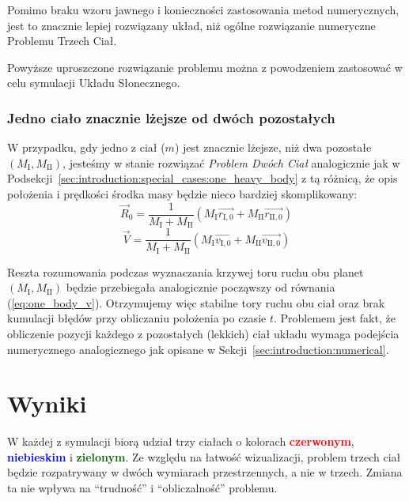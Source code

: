 \documentclass{article}
\begin{document}
Pomimo braku wzoru jawnego i konieczności zastosowania metod numerycznych, jest to znacznie lepiej rozwiązany układ, niż ogólne rozwiązanie numeryczne Problemu Trzech Ciał.

Powyższe uproszczone rozwiązanie problemu można z powodzeniem zastosować w celu symulacji Układu Słonecznego.

\subsubsection{Jedno ciało znacznie lżejsze od dwóch pozostałych}
W przypadku, gdy jedno z ciał ($m$) jest znacznie lżejsze, niż dwa pozostałe $(M_{\mathrm{I}}, M_{\mathrm{II}})$, jesteśmy w stanie rozwiązać \textit{Problem Dwóch Ciał} analogicznie jak w Podsekcji~\ref{sec:introduction:special_cases:one_heavy_body} z tą różnicą, że opis położenia i prędkości środka masy będzie nieco bardziej skomplikowany:
\begin{equation}
    \vec{R}_0 = \frac{1}{M_{\mathrm{I}} + M_{\mathrm{II}}}
    \left(
        M_{\mathrm{I}} \vec{r_{{\mathrm{I}}, 0}}
        + M_{\mathrm{II}} \vec{r_{{\mathrm{II}}, 0}}
    \right)
\end{equation}
\begin{equation}
    \vec{V} = \frac{1}{M_{\mathrm{I}} + M_{\mathrm{II}}}
    \left(
        M_{\mathrm{I}} \vec{v_{{\mathrm{I}}, 0}}
        + M_{\mathrm{II}} \vec{v_{{\mathrm{II}}, 0}}
    \right)
\end{equation}

Reszta rozumowania podczas wyznaczania krzywej toru ruchu obu planet $(M_{\mathrm{I}}, M_{\mathrm{II}})$ będzie przebiegała analogicznie począwszy od równania (\ref{eq:one_body_v}). Otrzymujemy więc stabilne tory ruchu obu ciał oraz brak kumulacji błędów przy obliczaniu położenia po czasie $t$. Problemem jest fakt, że obliczenie pozycji każdego z pozostałych (lekkich) ciał układu wymaga podejścia numerycznego analogicznego jak opisane w Sekcji~\ref{sec:introduction:numerical}.

\section{Wyniki}
W każdej z symulacji biorą udział trzy ciałach o kolorach \textbf{\textcolor{red}{czerwonym}}, \textbf{\textcolor{blue}{niebieskim}} i \textbf{\textcolor{DarkGreen}{zielonym}}. Ze względu na łatwość wizualizacji, problem trzech ciał będzie rozpatrywany w dwóch wymiarach przestrzennych, a nie w trzech. Zmiana ta nie wpływa na \enquote{trudność} i \enquote{obliczalność} problemu.
\end{document}
